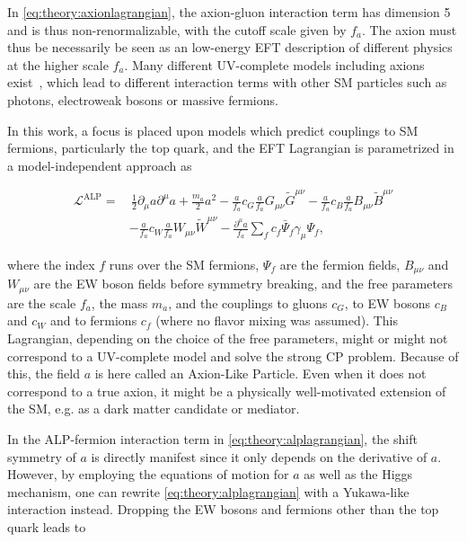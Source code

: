 In \cref{eq:theory:axionlagrangian}, the axion-gluon interaction term has dimension 5 and is thus non-renormalizable, with the cutoff scale given by $f_a$. The axion must thus be necessarily be seen as an low-energy EFT description of different physics at the higher scale $f_a$. Many different UV-complete models including axions exist~\cite{DiLuzio:2020wdo,Kim:1979if,Shifman:1979if,Dine:1981rt,Zhitnitsky:1980tq}, which lead to different interaction terms with other SM particles such as photons, electroweak bosons or massive fermions.

In this work, a focus is placed upon models which predict couplings to SM fermions, particularly the top quark, and the EFT Lagrangian is parametrized in a model-independent approach as~\cite{Georgi:1986df}

\begin{equation}
\begin{split}
\label{eq:theory:alplagrangian}
    \mathcal{L}^{\mathrm{ALP}} =& \, \frac{1}{2} \partial_\mu a \partial^\mu a
    + \frac{m_a}{2} a^2
    - \frac{a}{f_a} c_G \frac{a}{f_a} G_{\mu \nu} \tilde{G}^{\mu \nu}
    - \frac{a}{f_a} c_B \frac{a}{f_a} B_{\mu \nu} \tilde{B}^{\mu \nu} \\
    & - \frac{a}{f_a} c_W \frac{a}{f_a} W_{\mu \nu} \tilde{W}^{\mu \nu}
    - \frac{\partial^\mu a}{f_a} \sum_f c_f \bar{\Psi}_f \gamma_\mu \Psi_f ,
\end{split}
\end{equation}

\noindent where the index $f$ runs over the SM fermions, $\Psi_f$ are the fermion fields, $B_{\mu \nu}$ and $W_{\mu \nu}$ are the EW boson fields before symmetry breaking, and the free parameters are the scale $f_a$, the mass $m_a$, and the couplings to gluons $c_G$, to EW bosons $c_B$ and $c_W$ and to fermions $c_f$ (where no flavor mixing was assumed). This Lagrangian, depending on the choice of the free parameters, might or might not correspond to a UV-complete model and solve the strong CP problem. Because of this, the field $a$ is here called an Axion-Like Particle. Even when it does not correspond to a true axion, it might be a physically well-motivated extension of the SM, e.g. as a dark matter candidate or mediator.

In the ALP-fermion interaction term in \cref{eq:theory:alplagrangian}, the shift symmetry of $a$ is directly manifest since it only depends on the derivative of $a$. However, by employing the equations of motion for $a$ as well as the Higgs mechanism, one can rewrite \cref{eq:theory:alplagrangian} with a Yukawa-like interaction instead. Dropping the EW bosons and fermions other than the top quark leads to

